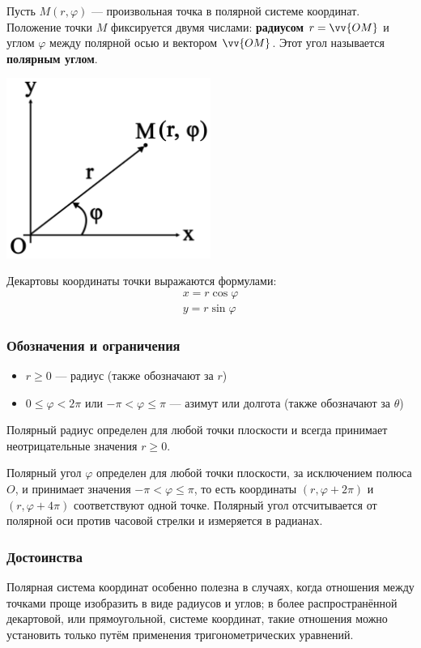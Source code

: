 \documentclass[a4paper,12pt,oneside]{extbook}
\theoremstyle{numbered}
\theoremstyle{unnumbered}
\theoremstyle{named}
\theoremstyle{unnumbered}
\theoremstyle{named}
\theoremstyle{named}
\theoremstyle{named}
\begin{document}
Пусть \(M (r, \varphi)\) — произвольная точка в полярной системе координат.
Положение точки \(M\) фиксируется двумя числами: \textbf{радиусом} \(r = \vv{OM}\) и углом \(\varphi\) между полярной осью и вектором \(\vv{OM}\).
Этот угол называется \textbf{полярным углом}.

\begin{center}
    \includegraphics[width=0.5\textwidth]{polar_system.png}
\end{center}

Декартовы координаты точки выражаются формулами:
\begin{gather*}
    x = r \cos{\varphi} \\
    y = r \sin{\varphi}
\end{gather*}

\subsubsection{Обозначения и ограничения}
\begin{itemize}
    \item {\(r \geq 0\) — радиус (также обозначают за \(r\))}
    \item {\(0 \leq \varphi < 2\pi\) или \(-\pi < \varphi \leq \pi\) — азимут или долгота (также обозначают за \(\theta\))}
\end{itemize}

Полярный радиус определен для любой точки плоскости и всегда принимает неотрицательные значения \(r \geq 0\).

Полярный угол \(\varphi\) определен для любой точки плоскости, за исключением полюса \(O\), и принимает значения \(-\pi < \varphi \leq \pi\), то есть координаты \((r, \varphi + 2\pi)\) и  \((r, \varphi + 4\pi)\) соответствуют одной точке.
Полярный угол отсчитывается от полярной оси против часовой стрелки и измеряется в радианах.

\subsubsection{Достоинства}
Полярная система координат особенно полезна в случаях, когда отношения между точками проще изобразить в виде радиусов и углов; в более распространённой декартовой, или прямоугольной, системе координат, такие отношения можно установить только путём применения тригонометрических уравнений.
\end{document}
